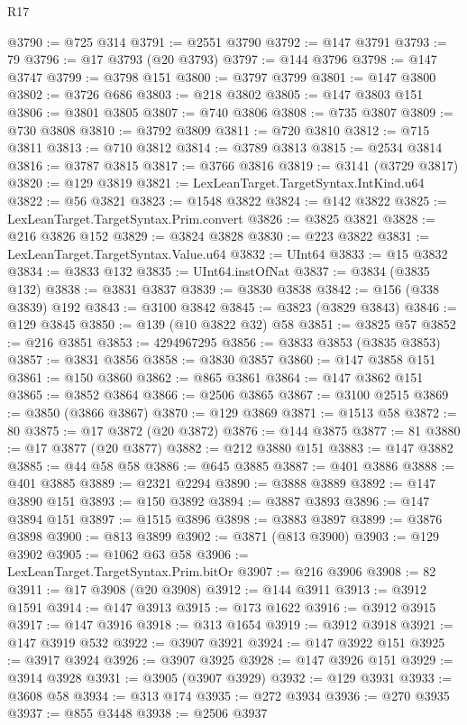 \begin{lexlean}{R17}
\begin{coremodule}
@3790 := @725 @314
@3791 := @2551 @3790
@3792 := @147 @3791
@3793 := 79
@3796 := @17 @3793 (@20 @3793)
@3797 := @144 @3796
@3798 := @147 @3747
@3799 := @3798 @151
@3800 := @3797 @3799
@3801 := @147 @3800
@3802 := @3726 @686
@3803 := @218 @3802
@3805 := @147 @3803 @151
@3806 := @3801 @3805
@3807 := @740 @3806
@3808 := @735 @3807
@3809 := @730 @3808
@3810 := @3792 @3809
@3811 := @720 @3810
@3812 := @715 @3811
@3813 := @710 @3812
@3814 := @3789 @3813
@3815 := @2534 @3814
@3816 := @3787 @3815
@3817 := @3766 @3816
@3819 := @3141 (@3729 @3817)
@3820 := @129 @3819
@3821 := LexLeanTarget.TargetSyntax.IntKind.u64
@3822 := @56 @3821
@3823 := @1548 @3822
@3824 := @142 @3822
@3825 := LexLeanTarget.TargetSyntax.Prim.convert
@3826 := @3825 @3821
@3828 := @216 @3826 @152
@3829 := @3824 @3828
@3830 := @223 @3822
@3831 := LexLeanTarget.TargetSyntax.Value.u64
@3832 := UInt64
@3833 := @15 @3832
@3834 := @3833 @132
@3835 := UInt64.instOfNat
@3837 := @3834 (@3835 @132)
@3838 := @3831 @3837
@3839 := @3830 @3838
@3842 := @156 (@338 @3839) @192
@3843 := @3100 @3842
@3845 := @3823 (@3829 @3843)
@3846 := @129 @3845
@3850 := @139 (@10 @3822 @32) @58
@3851 := @3825 @57
@3852 := @216 @3851
@3853 := 4294967295
@3856 := @3833 @3853 (@3835 @3853)
@3857 := @3831 @3856
@3858 := @3830 @3857
@3860 := @147 @3858 @151
@3861 := @150 @3860
@3862 := @865 @3861
@3864 := @147 @3862 @151
@3865 := @3852 @3864
@3866 := @2506 @3865
@3867 := @3100 @2515
@3869 := @3850 (@3866 @3867)
@3870 := @129 @3869
@3871 := @1513 @58
@3872 := 80
@3875 := @17 @3872 (@20 @3872)
@3876 := @144 @3875
@3877 := 81
@3880 := @17 @3877 (@20 @3877)
@3882 := @212 @3880 @151
@3883 := @147 @3882
@3885 := @44 @58 @58
@3886 := @645 @3885
@3887 := @401 @3886
@3888 := @401 @3885
@3889 := @2321 @2294
@3890 := @3888 @3889
@3892 := @147 @3890 @151
@3893 := @150 @3892
@3894 := @3887 @3893
@3896 := @147 @3894 @151
@3897 := @1515 @3896
@3898 := @3883 @3897
@3899 := @3876 @3898
@3900 := @813 @3899
@3902 := @3871 (@813 @3900)
@3903 := @129 @3902
@3905 := @1062 @63 @58
@3906 := LexLeanTarget.TargetSyntax.Prim.bitOr
@3907 := @216 @3906
@3908 := 82
@3911 := @17 @3908 (@20 @3908)
@3912 := @144 @3911
@3913 := @3912 @1591
@3914 := @147 @3913
@3915 := @173 @1622
@3916 := @3912 @3915
@3917 := @147 @3916
@3918 := @313 @1654
@3919 := @3912 @3918
@3921 := @147 @3919 @532
@3922 := @3907 @3921
@3924 := @147 @3922 @151
@3925 := @3917 @3924
@3926 := @3907 @3925
@3928 := @147 @3926 @151
@3929 := @3914 @3928
@3931 := @3905 (@3907 @3929)
@3932 := @129 @3931
@3933 := @3608 @58
@3934 := @313 @174
@3935 := @272 @3934
@3936 := @270 @3935
@3937 := @855 @3448
@3938 := @2506 @3937

\end{coremodule}
\end{lexlean}

